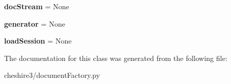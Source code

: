 \begin{DoxyCompactItemize}
\item 
\hypertarget{classcheshire3_1_1document_factory_1_1_simple_document_factory_a44294f96644589d1d0c41e10101abf00}{{\bfseries doc\-Stream} = None}\label{classcheshire3_1_1document_factory_1_1_simple_document_factory_a44294f96644589d1d0c41e10101abf00}

\item 
\hypertarget{classcheshire3_1_1document_factory_1_1_simple_document_factory_a31a6762e03252fc4e1de8c5457ced051}{{\bfseries generator} = None}\label{classcheshire3_1_1document_factory_1_1_simple_document_factory_a31a6762e03252fc4e1de8c5457ced051}

\item 
\hypertarget{classcheshire3_1_1document_factory_1_1_simple_document_factory_a219ebbe2ab33a3df2b1637f92d30a4ad}{{\bfseries load\-Session} = None}\label{classcheshire3_1_1document_factory_1_1_simple_document_factory_a219ebbe2ab33a3df2b1637f92d30a4ad}

\end{DoxyCompactItemize}


The documentation for this class was generated from the following file\-:\begin{DoxyCompactItemize}
\item 
cheshire3/document\-Factory.\-py\end{DoxyCompactItemize}
